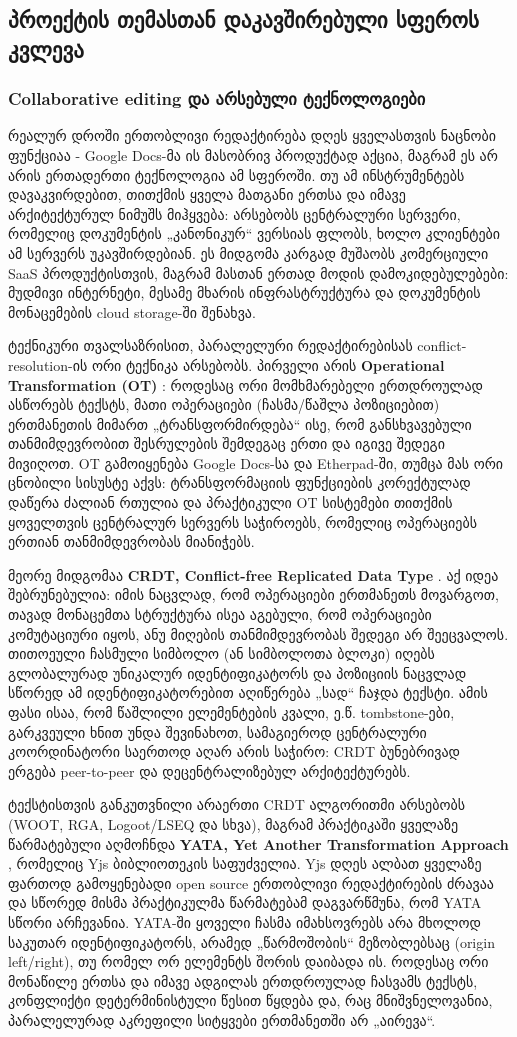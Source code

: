 \subsection{პროექტის თემასთან დაკავშირებული სფეროს კვლევა}

\subsubsection{Collaborative editing და არსებული ტექნოლოგიები}

რეალურ დროში ერთობლივი რედაქტირება დღეს ყველასთვის ნაცნობი ფუნქციაა -
Google Docs-მა ის მასობრივ პროდუქტად აქცია, მაგრამ ეს არ არის ერთადერთი ტექნოლოგია ამ სფეროში. 
თუ ამ ინსტრუმენტებს დავაკვირდებით, თითქმის ყველა მათგანი ერთსა და იმავე
არქიტექტურულ ნიმუშს მიჰყვება: არსებობს ცენტრალური სერვერი, რომელიც
დოკუმენტის „კანონიკურ“ ვერსიას ფლობს, ხოლო კლიენტები ამ სერვერს
უკავშირდებიან. ეს მიდგომა კარგად მუშაობს კომერციული SaaS პროდუქტისთვის,
მაგრამ მასთან ერთად მოდის დამოკიდებულებები: მუდმივი ინტერნეტი, მესამე
მხარის ინფრასტრუქტურა და დოკუმენტის მონაცემების cloud storage-ში შენახვა.

ტექნიკური თვალსაზრისით, პარალელური რედაქტირებისას conflict-resolution-ის ორი
ტექნიკა არსებობს. პირველი არის
\textbf{Operational Transformation (OT)} \cite{ot}: როდესაც ორი
მომხმარებელი ერთდროულად ასწორებს ტექსტს, მათი ოპერაციები (ჩასმა/წაშლა
პოზიციებით) ერთმანეთის მიმართ „ტრანსფორმირდება“ ისე, რომ განსხვავებული
თანმიმდევრობით შესრულების შემდეგაც ერთი და იგივე შედეგი მივიღოთ. OT
გამოიყენება Google Docs-სა და Etherpad-ში, თუმცა მას ორი ცნობილი სისუსტე
აქვს: ტრანსფორმაციის ფუნქციების კორექტულად დაწერა ძალიან რთულია 
და პრაქტიკული OT სისტემები თითქმის ყოველთვის ცენტრალურ სერვერს
საჭიროებს, რომელიც ოპერაციებს ერთიან თანმიმდევრობას მიანიჭებს.

მეორე მიდგომაა \textbf{CRDT, Conflict-free Replicated Data Type}
\cite{crdt}. აქ იდეა შებრუნებულია: იმის ნაცვლად, რომ ოპერაციები
ერთმანეთს მოვარგოთ, თავად მონაცემთა სტრუქტურა ისეა აგებული, რომ
ოპერაციები კომუტაციური იყოს, ანუ მიღების თანმიმდევრობას შედეგი არ
შეეცვალოს. თითოეული ჩასმული სიმბოლო (ან სიმბოლოთა ბლოკი) იღებს გლობალურად
უნიკალურ იდენტიფიკატორს და პოზიციის ნაცვლად სწორედ ამ იდენტიფიკატორებით
აღიწერება „სად“ ჩაჯდა ტექსტი. ამის ფასი ისაა, რომ წაშლილი ელემენტების
კვალი, ე.წ. tombstone-ები, გარკვეული ხნით უნდა შევინახოთ, სამაგიეროდ
ცენტრალური კოორდინატორი საერთოდ აღარ არის საჭირო: CRDT ბუნებრივად ერგება
peer-to-peer და დეცენტრალიზებულ არქიტექტურებს.

ტექსტისთვის განკუთვნილი არაერთი CRDT ალგორითმი არსებობს (WOOT, RGA,
Logoot/LSEQ და სხვა), მაგრამ პრაქტიკაში ყველაზე წარმატებული აღმოჩნდა
\textbf{YATA, Yet Another Transformation Approach} \cite{yata}, რომელიც
Yjs ბიბლიოთეკის \cite{yjs} საფუძველია. Yjs დღეს ალბათ ყველაზე ფართოდ
გამოყენებადი open source ერთობლივი რედაქტირების ძრავაა და სწორედ მისმა
პრაქტიკულმა წარმატებამ დაგვარწმუნა, რომ YATA სწორი არჩევანია. YATA-ში
ყოველი ჩასმა იმახსოვრებს არა მხოლოდ საკუთარ იდენტიფიკატორს, არამედ
„წარმოშობის“ მეზობლებსაც (origin left/right), თუ რომელ ორ ელემენტს შორის
დაიბადა ის. როდესაც ორი მონაწილე ერთსა და იმავე ადგილას ერთდროულად ჩასვამს
ტექსტს, კონფლიქტი დეტერმინისტული წესით წყდება და, რაც მნიშვნელოვანია,
პარალელურად აკრეფილი სიტყვები ერთმანეთში არ „აირევა“.

